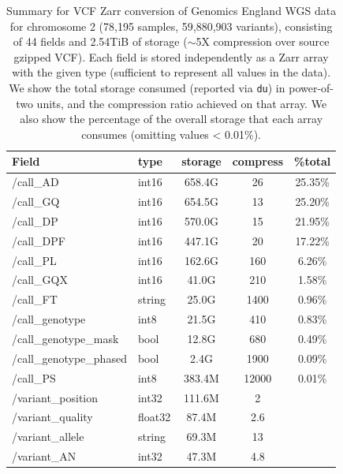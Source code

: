 \documentclass[a4paper,num-refs]{oup-contemporary}
\begin{document}
\begin{table}
\caption{Summary for VCF Zarr conversion of 
Genomics England WGS data for chromosome 2 (78,195 samples, 59,880,903 variants),
consisting of 44 fields and 2.54TiB of storage ($\sim$5X compression over
source gzipped VCF).
Each field is stored independently
as a Zarr array with the given type (sufficient to represent all values in the
data). We show the total storage consumed (reported via \texttt{du}) in
power-of-two units, and the compression ratio achieved on that array.
We also show the percentage of the overall storage that each array consumes
(omitting values < 0.01\%).
\label{tab-genomics-england-data}}
\begin{tabular}{llS[table-format=3.1]S[table-format=3.2]S[table-format=3.2]}
\toprule
{Field} & {type} & {storage} & {compress} & {\%total} \\
\midrule
/call\_AD & int16 & 658.4G & 26 & 25.35\% \\
/call\_GQ & int16 & 654.5G & 13 & 25.20\% \\
/call\_DP & int16 & 570.0G & 15 & 21.95\% \\
/call\_DPF & int16 & 447.1G & 20 & 17.22\% \\
/call\_PL & int16 & 162.6G & 160 & 6.26\% \\
/call\_GQX & int16 & 41.0G & 210 & 1.58\% \\
/call\_FT & string & 25.0G & 1400& 0.96\% \\
/call\_genotype & int8 & 21.5G & 410& 0.83\% \\
/call\_genotype\_mask & bool & 12.8G & 680& 0.49\% \\
/call\_genotype\_phased & bool & 2.4G & 1900& 0.09\% \\
/call\_PS & int8 & 383.4M & 12000& 0.01\% \\
/variant\_position & int32 & 111.6M & 2 & \\
/variant\_quality & float32 & 87.4M & 2.6 & \\
/variant\_allele & string & 69.3M & 13 & \\
/variant\_AN & int32 & 47.3M & 4.8 & \\

\end{tabular}
\end{table}
\end{document}
